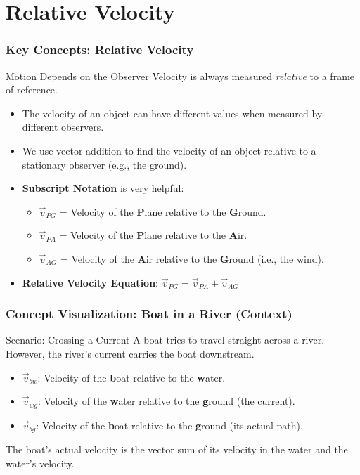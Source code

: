 \documentclass{beamer}
\begin{document}
\section{Relative Velocity}

\begin{frame}
\frametitle{Key Concepts: Relative Velocity}
\begin{block}{Motion Depends on the Observer}
Velocity is always measured \textit{relative} to a frame of reference.
\end{block}
\begin{itemize}
    \item The velocity of an object can have different values when measured by different observers.
    \item We use vector addition to find the velocity of an object relative to a stationary observer (e.g., the ground).
    \item \textbf{Subscript Notation} is very helpful:
    \begin{itemize}
        \item $\vec{v}_{PG}$ = Velocity of the \textbf{P}lane relative to the \textbf{G}round.
        \item $\vec{v}_{PA}$ = Velocity of the \textbf{P}lane relative to the \textbf{A}ir.
        \item $\vec{v}_{AG}$ = Velocity of the \textbf{A}ir relative to the \textbf{G}round (i.e., the wind).
    \end{itemize}
    \item \textbf{Relative Velocity Equation}: $\vec{v}_{PG} = \vec{v}_{PA} + \vec{v}_{AG}$
\end{itemize}
\end{frame}

\begin{frame}
\frametitle{Concept Visualization: Boat in a River (Context)}
\begin{block}{Scenario: Crossing a Current}
A boat tries to travel straight across a river. However, the river's current carries the boat downstream.
\begin{itemize}
    \item $\vec{v}_{bw}$: Velocity of the \textbf{b}oat relative to the \textbf{w}ater.
    \item $\vec{v}_{wg}$: Velocity of the \textbf{w}ater relative to the \textbf{g}round (the current).
    \item $\vec{v}_{bg}$: Velocity of the \textbf{b}oat relative to the \textbf{g}round (its actual path).
\end{itemize}
The boat's actual velocity is the vector sum of its velocity in the water and the water's velocity.
\end{block}
\end{frame}
\end{document}
